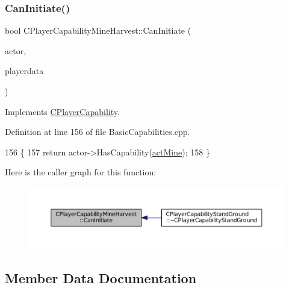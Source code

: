 \subsubsection{\texorpdfstring{Can\+Initiate()}{CanInitiate()}}
{\footnotesize\ttfamily bool C\+Player\+Capability\+Mine\+Harvest\+::\+Can\+Initiate (\begin{DoxyParamCaption}\item[{std\+::shared\+\_\+ptr$<$ \hyperlink{classCPlayerAsset}{C\+Player\+Asset} $>$}]{actor,  }\item[{std\+::shared\+\_\+ptr$<$ \hyperlink{classCPlayerData}{C\+Player\+Data} $>$}]{playerdata }\end{DoxyParamCaption})\hspace{0.3cm}{\ttfamily [virtual]}}



Implements \hyperlink{classCPlayerCapability_aa83b1e1fcaff2985c378132d679154ea}{C\+Player\+Capability}.



Definition at line 156 of file Basic\+Capabilities.\+cpp.


\begin{DoxyCode}
156                                                                                                            
                     \{
157     \textcolor{keywordflow}{return} actor->HasCapability(\hyperlink{GameDataTypes_8h_a35b98ce26aca678b03c6f9f76e4778cea2e0db284fd05caa56e3867c661ccdd8b}{actMine});
158 \}
\end{DoxyCode}
Here is the caller graph for this function\+:
\nopagebreak
\begin{figure}[H]
\begin{center}
\leavevmode
\includegraphics[width=350pt]{classCPlayerCapabilityMineHarvest_a37944eb249559f1246348b47e3f24dee_icgraph}
\end{center}
\end{figure}


\subsection{Member Data Documentation}
\hypertarget{classCPlayerCapabilityMineHarvest_aa493df2fd0bbae27ce1b7c4e2250a28c}{}\label{classCPlayerCapabilityMineHarvest_aa493df2fd0bbae27ce1b7c4e2250a28c} 
